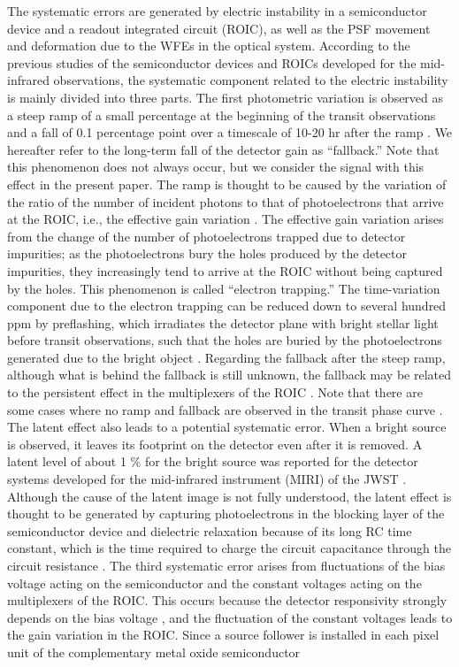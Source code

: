 \documentclass{aastex62}
\begin{document}
The systematic errors are generated by electric instability in a semiconductor device and a readout integrated circuit (ROIC), as well as the PSF movement and deformation due to the WFEs in the optical system. According to the previous studies of the semiconductor devices and ROICs developed for the mid-infrared observations, the systematic component related to the electric instability is mainly divided into three parts. The first photometric variation is observed as a steep ramp of a small percentage at the beginning of the transit observations and a fall of 0.1 percentage point over a timescale of 10-20 hr after the ramp \citep[e.g.,][]{2003SPIE.4850...98Y, 2012ApJ...752...81C}. We hereafter refer to the long-term fall of the detector gain as “fallback.” Note that this phenomenon does not always occur, but we consider the signal with this effect in the present paper. The ramp is thought to be caused by the variation of the ratio of the number of incident photons to that of photoelectrons that arrive at the ROIC, i.e., the effective gain variation \citep{2009ApJ...703..769K, 2009ApJ...703.1884S, 2010ApJ...721.1861A}. The effective gain variation arises from the change of the number of photoelectrons trapped due to detector impurities; as the photoelectrons bury the holes produced by the detector impurities, they increasingly tend to arrive at the ROIC without being captured by the holes. This phenomenon is called “electron trapping.” The time-variation component due to the electron trapping can be reduced down to several hundred ppm by preflashing, which irradiates the detector plane with bright stellar light before transit observations, such that the holes are buried by the photoelectrons generated due to the bright object \citep{2009ApJ...703..769K, 2009ApJ...703.1884S}. Regarding the fallback after the steep ramp, although what is behind the fallback is still unknown, the fallback may be related to the persistent effect in the multiplexers of the ROIC \citep{2012ApJ...752...81C}. Note that there are some cases where no ramp and fallback are observed in the transit phase curve \citep[e.g.,][]{2007Natur.447..183K}. The latent effect also leads to a potential systematic error. When a bright source is observed, it leaves its footprint on the detector even after it is removed. A latent level of about 1 \% for the bright source was reported for the detector systems developed for the mid-infrared instrument (MIRI) of the JWST \citep{2015PASP..127..675R}. Although the cause of the latent image is not fully understood, the latent effect is thought to be generated by capturing photoelectrons in the blocking layer of the semiconductor device and dielectric relaxation because of its long RC time constant, which is the time required to charge the circuit capacitance through the circuit resistance \citep{2015PASP..127..665R}. The third systematic error arises from fluctuations of the bias voltage acting on the semiconductor and the constant voltages acting on the multiplexers of the ROIC. This occurs because the detector responsivity strongly depends on the bias voltage \citep{2015PASP..127..665R}, and the fluctuation of the constant voltages leads to the gain variation in the ROIC. Since a source follower is installed in each pixel unit of the complementary metal oxide semiconductor 
\end{document}
